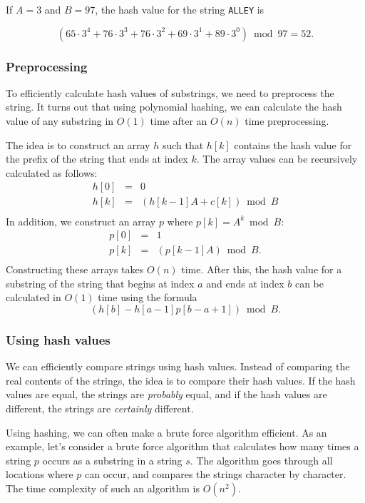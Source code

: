 If $A=3$ and $B=97$, the hash value
for the string \texttt{ALLEY} is

\[(65 \cdot 3^4 + 76 \cdot 3^3 + 76 \cdot 3^2 + 69 \cdot 3^1 + 89 \cdot 3^0) \bmod 97 = 52.\]

\subsubsection*{Preprocessing}

To efficiently calculate hash values of substrings,
we need to preprocess the string.
It turns out that using polynomial hashing,
we can calculate the hash value of any substring
in $O(1)$ time after an $O(n)$ time preprocessing.

The idea is to construct an array $h$ such that
$h[k]$ contains the hash value for the prefix
of the string that ends at index $k$.
The array values can be recursively calculated as follows:
\[
\begin{array}{lcl}
h[0] & = & 0 \\
h[k] & = & (h[k-1] A + c[k]) \bmod B \\
\end{array}
\]
In addition, we construct an array $p$
where $p[k]=A^k \bmod B$:
\[
\begin{array}{lcl}
p[0] & = & 1 \\
p[k] & = & (p[k-1] A) \bmod B. \\
\end{array}
\]
Constructing these arrays takes $O(n)$ time.
After this, the hash value for a substring
of the string
that begins at index $a$ and ends at index $b$
can be calculated in $O(1)$ time using the formula
\[(h[b]-h[a-1] p[b-a+1]) \bmod B.\]

\subsubsection*{Using hash values}

We can efficiently compare strings using hash values.
Instead of comparing the real contents of the strings,
the idea is to compare their hash values.
If the hash values are equal,
the strings are \emph{probably} equal,
and if the hash values are different,
the strings are \emph{certainly} different.

Using hashing, we can often make a brute force
algorithm efficient.
As an example, let's consider a brute force
algorithm that calculates how many times
a string $p$ occurs as a substring in
a string $s$.
The algorithm goes through all locations
where $p$ can occur, and compares the strings
character by character.
The time complexity of such an algorithm is $O(n^2)$.

